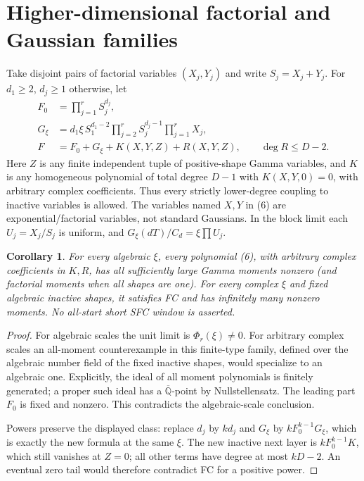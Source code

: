 \documentclass[11pt]{article}
\newtheorem{corollary}[theorem]{Corollary}
\newcommand{\Qb}{\overline{\mathbb Q}}
\begin{document}
\section{Higher-dimensional factorial and Gaussian families}
Take disjoint pairs of factorial variables $(X_j,Y_j)$ and write
$S_j=X_j+Y_j$. For $d_1\geq2$, $d_j\geq1$ otherwise, let
\[
 \begin{split}
 F_0&=\prod_{j=1}^r S_j^{d_j},\\
 G_\xi&=d_1\xi\,S_1^{d_1-2}
           \prod_{j=2}^rS_j^{d_j-1}\prod_{j=1}^r X_j,\\
 F&=F_0+G_\xi+K(X,Y,Z)+R(X,Y,Z),\qquad \deg R\leq D-2.
 \end{split}
 \tag{6}
\]
Here $Z$ is any finite independent tuple of positive-shape Gamma
variables, and $K$ is any homogeneous polynomial of total degree $D-1$
with $K(X,Y,0)=0$, with arbitrary complex coefficients. Thus every
strictly lower-degree coupling to inactive variables is allowed.
The variables named $X,Y$ in (6) are exponential/factorial variables,
not standard Gaussians. In the block limit each $U_j=X_j/S_j$ is uniform,
and $G_\xi(dT)/C_d=\xi\prod U_j$.

\begin{corollary}\label{cor:FC}
For every algebraic $\xi$, every polynomial (6), with arbitrary complex
coefficients in $K,R$, has all sufficiently large Gamma moments nonzero
(and factorial moments when all shapes are one).
For every complex $\xi$ and fixed algebraic inactive shapes, it
satisfies FC and has infinitely many nonzero moments. No all-start short SFC window is asserted.
\end{corollary}
\begin{proof}
For algebraic scales the unit limit is $\Phi_r(\xi)\ne0$.
For arbitrary complex scales an all-moment counterexample in this
finite-type family, defined over the algebraic number field of the
fixed inactive shapes, would specialize to an algebraic one. Explicitly, the ideal of all moment polynomials is finitely
generated; a proper such ideal has a $\Qb$-point by Nullstellensatz.
The leading part $F_0$ is fixed and nonzero. This contradicts the
algebraic-scale conclusion.

Powers preserve the displayed class: replace $d_j$ by $k d_j$ and
$G_\xi$ by $kF_0^{k-1}G_\xi$, which is exactly the new formula at the
same $\xi$. The new inactive next layer is $kF_0^{k-1}K$,
which still vanishes at $Z=0$; all other terms have degree at most $kD-2$.
An eventual zero tail would therefore contradict FC for a positive power.
\end{proof}
\end{document}
